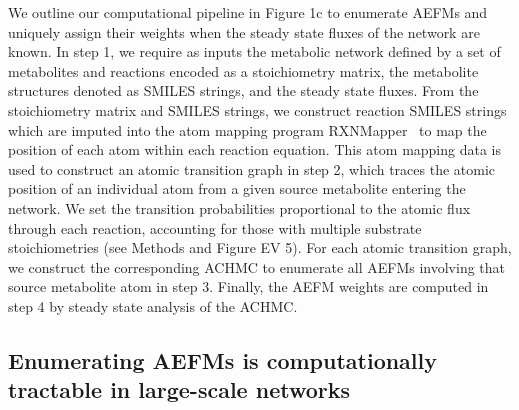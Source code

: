 \documentclass[12pt]{article}
\begin{document}
We outline our computational pipeline in Figure 1c to enumerate AEFMs and
uniquely assign their weights when the steady state fluxes of the network
are known. In step 1, we require as inputs the metabolic network defined
by a set of metabolites and reactions encoded as a stoichiometry matrix,
the metabolite structures denoted as SMILES strings, and the steady state
fluxes. From the stoichiometry matrix and SMILES strings, we construct
reaction SMILES strings which are imputed into the atom mapping program
RXNMapper~\citep{Schwaller2021extraction} to map the position of each atom
within each reaction equation. This atom mapping data is used to construct
an atomic transition graph in step 2, which traces the atomic position of
an individual atom from a given source metabolite entering the network. We
set the transition probabilities proportional to the atomic flux through
each reaction, accounting for those with multiple substrate
stoichiometries (see Methods and Figure EV 5).
For each atomic transition graph, we construct the corresponding ACHMC to
enumerate all AEFMs involving that source metabolite atom in step 3.
Finally, the AEFM weights are computed in step 4 by steady state analysis
of the ACHMC. 

\subsection*{Enumerating AEFMs is computationally tractable in large-scale networks}
\end{document}
